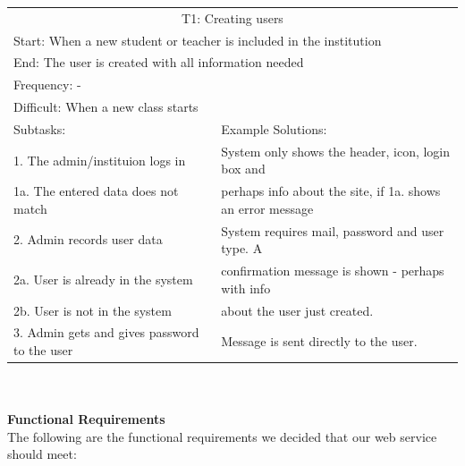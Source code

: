 \documentclass[10pt,a4paper]{article}
\begin{document}
\begin{tabularx}{\textwidth} {|X|X|}
\hline
\multicolumn{2}{|c|}{T1: Creating users }\\
\multicolumn{2}{|l|}{Start: When a new student or teacher is included in the institution}\\
\multicolumn{2}{|l|}{End: The user is created with all information needed}\\
\multicolumn{2}{|l|}{Frequency: - }\\
\multicolumn{2}{|l|}{Difficult: When a new class starts}\\
\hline
Subtasks: & Example Solutions:\\
\hline
1. The admin/instituion logs in & System only shows the header, icon, login box and\\ 1a. The entered data does not match & perhaps info about the site, if 1a. shows an error message\\
\hline
2. Admin records user data & System requires mail, password and user type.
A\\
2a. User is already in the system  & confirmation message is shown - perhaps with info \\
2b. User is not in the system & about the user just created.\\
\hline
3. Admin gets and gives password to the user & Message is sent directly to the user. \\
\hline
\end{tabularx}
\\\\

{\bfseries Functional Requirements}\\
The following are the functional requirements we decided that our web service should meet:
\end{document}
